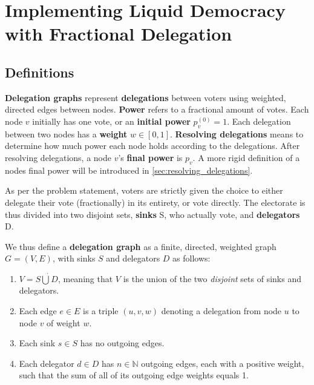 \section{Implementing Liquid Democracy with Fractional Delegation}
\label{sec:ld_with_frac_del}

\subsection{Definitions}

\textbf{Delegation graphs} represent \textbf{delegations} between voters using weighted, directed edges between nodes. \textbf{Power} refers to a fractional amount of votes. Each node $v$ initially has one vote, or an \textbf{initial power} $p^{(0)}_v = 1$. Each delegation between two nodes has a \textbf{weight} $w \in [0, 1] $\footnotemark. \textbf{Resolving delegations} means to determine how much power each node holds according to the delegations. After resolving delegations, a node $v$'s \textbf{final power} is $p_v$. A more rigid definition of a nodes final power will be introduced in \cref{sec:resolving_delegations}.


As per the problem statement, voters are strictly given the choice to either delegate their vote (fractionally) in its entirety, or vote directly. The electorate is thus divided into two disjoint sets, \textbf{sinks} S, who actually vote, and \textbf{delegators} D. 

We thus define a \textbf{delegation graph} as a finite, directed, weighted graph $G = (V, E)$, with sinks $S$ and delegators $D$ as follows:

\begin{enumerate}
\item $V = S \dot\bigcup D$, meaning that $V$ is the union of the two \textit{disjoint} sets of sinks and delegators.
\item Each edge $e \in E$ is a triple $(u, v, w)$ denoting a delegation from node $u$ to node $v$ of weight $w$.
\item Each sink $s \in S$ has no outgoing edges.
\item Each delegator $d \in D$ has $n \in \mathbb{N}$ outgoing edges, each with a positive weight, such that the sum of all of its outgoing edge weights equals 1.
\end{enumerate}

